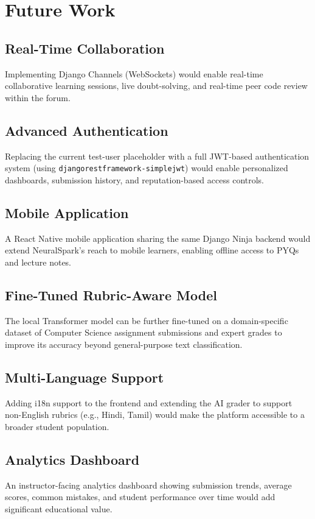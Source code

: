 \documentclass[12pt,a4paper]{report}
\begin{document}
\chapter{Future Work}

\section{Real-Time Collaboration}
Implementing Django Channels (WebSockets) would enable real-time collaborative learning sessions,
live doubt-solving, and real-time peer code review within the forum.

\section{Advanced Authentication}
Replacing the current test-user placeholder with a full JWT-based authentication system
(using \texttt{djangorestframework-simplejwt}) would enable personalized dashboards,
submission history, and reputation-based access controls.

\section{Mobile Application}
A React Native mobile application sharing the same Django Ninja backend would extend
NeuralSpark's reach to mobile learners, enabling offline access to PYQs and lecture notes.

\section{Fine-Tuned Rubric-Aware Model}
The local Transformer model can be further fine-tuned on a domain-specific dataset of
Computer Science assignment submissions and expert grades to improve its accuracy beyond
general-purpose text classification.

\section{Multi-Language Support}
Adding i18n support to the frontend and extending the AI grader to support non-English
rubrics (e.g., Hindi, Tamil) would make the platform accessible to a broader student population.

\section{Analytics Dashboard}
An instructor-facing analytics dashboard showing submission trends, average scores,
common mistakes, and student performance over time would add significant educational value.
\end{document}
